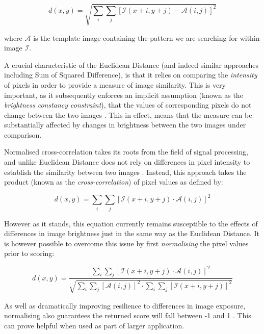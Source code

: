 \begin{equation}
d(x, y) = \sqrt{\sum\limits_{i}\sum\limits_{j}[\mathcal{I}(x + i, y + j) - \mathcal{A}(i, j)]^2}
\end{equation}

where $\mathcal{A}$ is the template image containing the pattern we are searching for within image $\mathcal{I}$. 

A crucial characteristic of the Euclidean Distance (and indeed similar approaches including Sum of Squared Difference), is that it relies on comparing the \textit{intensity} of pixels in order to provide a measure of image similarity. This is very important, as it subsequently enforces an implicit assumption (known as the \textit{brightness constancy constraint}), that the values of corresponding pixels do not change between the two images \cite{szeliski}. This in effect, means that the measure can be substantially affected by changes in brightness between the two images under comparison.  

Normalised cross-correlation takes its roots from the field of signal processing, and unlike Euclidean Distance does not rely on differences in pixel intensity to establish the similarity between two images \cite{szeliski}. Instead, this approach takes the product (known as the \textit{cross-correlation}) of pixel values as defined by:

\begin{equation}
d(x, y) = \sum\limits_{i}\sum\limits_{j}[\mathcal{I}(x + i, y + j) \cdot \mathcal{A}(i, j)]^2
\end{equation}

However as it stands, this equation currently remains susceptible to the effects of differences in image brightness just in the same way as the Euclidean Distance. It is however possible to overcome this issue by first \textit{normalising} the pixel values prior to scoring: 

\begin{equation}
d(x, y) = \frac{\sum\limits_{i}\sum\limits_{j}[\mathcal{I}(x + i, y + j) \cdot \mathcal{A}(i, j)]^2}{\sqrt{\sum\limits_{i}\sum\limits_{j}[\mathcal{A}(i, j)]^2 \cdot \sum\limits_{i}\sum\limits_{j}[\mathcal{I}(x + i, y + j)]^2}}
\end{equation}

As well as dramatically improving resilience to differences in image exposure, normalising also guarantees the returned score will fall between -1 and 1 \cite{szeliski}. This can prove helpful when used as part of larger application. 

